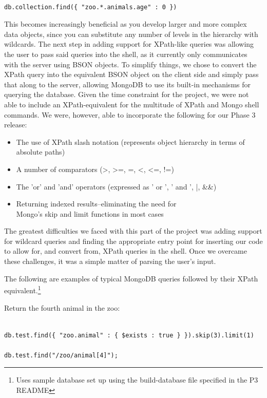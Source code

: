 \documentclass{../dependencies/acm_proc_article-sp}
\begin{document}
\begin{lstlisting}

db.collection.find({ "zoo.*.animals.age" : 0 })
\end{lstlisting}

This becomes increasingly beneficial as you develop larger and more complex data objects, since you can substitute any number of levels in the hierarchy with wildcards. The next step in adding support for XPath-like queries was allowing the user to pass said queries into the shell, as it currently only communicates with the server using BSON objects. To simplify things, we chose to convert the XPath query into the equivalent BSON object on the client side and simply pass that along to the server, allowing MongoDB to use its built-in mechanisms for querying the database. Given the time constraint for the project, we were not able to include an XPath-equivalent for the multitude of XPath and Mongo shell commands. We were, however, able to incorporate the following for our Phase 3 release:

\begin{itemize}
  \item	The use of XPath slash notation (represents object hierarchy in terms of absolute paths)
  \item	A number of comparators (>, >=, =, <, <=, !=)
  \item	The 'or' and 'and' operators (expressed as ' or ', ' and ', |, \&\&)
  \item	Returning indexed results--eliminating the need for \\ Mongo's skip and limit functions in most cases
\end{itemize}

The greatest difficulties we faced with this part of the project was adding support for wildcard queries and finding the appropriate entry point for inserting our code to allow for, and convert from, XPath queries in the shell. Once we overcame these challenges, it was a simple matter of parsing the user's input.

The following are examples of typical MongoDB queries followed by their XPath equivalent.\footnote{Uses sample database set up using the build-database file specified in the P3 README}

Return the fourth animal in the zoo:
\begin{lstlisting}

db.test.find({ "zoo.animal" : { $exists : true } }).skip(3).limit(1)

db.test.find("/zoo/animal[4]");
\end{lstlisting}
\end{document}
